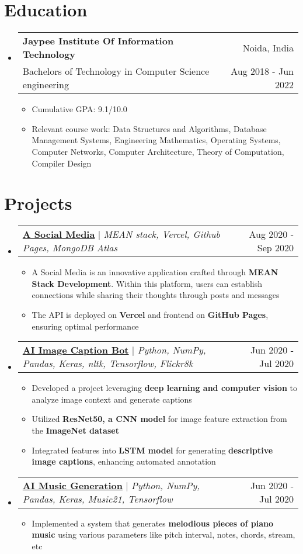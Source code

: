 \documentclass[letterpaper,13pt]{article}
\makeatletter
\newcommand{\resumeItem}[1]{
  \item\small{
    {#1 \vspace{-2pt}}
  }
}
\newcommand{\resumeSubheading}[4]{
  \vspace{-2pt}\item
    \begin{tabular*}{0.97\textwidth}[t]{l@{\extracolsep{\fill}}r}
      \textbf{#1} & #2 \\
      #3 & \small{#4} \\
    \end{tabular*}\vspace{-7pt}
}
\newcommand{\resumeProjectHeading}[2]{
    \item
    \begin{tabular*}{0.97\textwidth}{l@{\extracolsep{\fill}}r}
      \small#1 & #2 \\
    \end{tabular*}\vspace{-7pt}
}
\newcommand{\resumeItemListStart}{\begin{itemize}}
\newcommand{\resumeItemListEnd}{\end{itemize}\vspace{-5pt}}
\makeatother
\begin{document}
\section{Education}
  \begin{itemize}[leftmargin=*, label={}]
    \resumeSubheading
      {Jaypee Institute Of Information Technology}{Noida, India}
      {Bachelors of Technology in Computer Science engineering}{Aug 2018 - Jun 2022}
      \resumeItemListStart
      \resumeItem{Cumulative GPA: 9.1/10.0}
      \resumeItem{Relevant course work: Data Structures and Algorithms, Database Management Systems, Engineering Mathematics, Operating Systems, Computer Networks, Computer Architecture, Theory of Computation, Compiler Design}
      \resumeItemListEnd
  \end{itemize}

\section{Projects}
    \begin{itemize}[leftmargin=*, label={}]
      \resumeProjectHeading
          {\href{https://github.com/JayantGoel001/A-Social-Media}{\textbf{A Social Media}} $|$ \emph{MEAN stack, Vercel, Github Pages, MongoDB Atlas}}{Aug 2020 - Sep 2020}
          \resumeItemListStart
            \resumeItem{A Social Media is an innovative application crafted through \textbf{MEAN Stack Development}. Within this platform, users can establish connections while sharing their thoughts through posts and messages}
            \resumeItem{The API is deployed on \textbf{Vercel} and frontend on \textbf{GitHub Pages}, ensuring optimal performance}
          \resumeItemListEnd
      \resumeProjectHeading
          {\href{https://github.com/JayantGoel001/AI-Image-Caption-Bot}{\textbf{AI Image Caption Bot}} $|$ \emph{Python, NumPy, Pandas, Keras, nltk, Tensorflow, Flickr8k}}{Jun 2020 - Jul 2020}
          \resumeItemListStart
            \resumeItem{Developed a project leveraging \textbf{deep learning and computer vision} to analyze image context and generate captions}
            \resumeItem{Utilized \textbf{ResNet50, a CNN model} for image feature extraction from the \textbf{ImageNet dataset}}
            \resumeItem{Integrated features into \textbf{LSTM model} for generating \textbf{descriptive image captions}, enhancing automated annotation}
          \resumeItemListEnd
      \resumeProjectHeading
          {\href{https://github.com/JayantGoel001/AI-Music-Generation}{\textbf{AI Music Generation}} $|$ \emph{Python, NumPy, Pandas, Keras, Music21, Tensorflow}}{Jun 2020 - Jul 2020}
          \resumeItemListStart
            \resumeItem{Implemented a system that generates \textbf{melodious pieces of piano music} using various parameters like pitch interval, notes, chords, stream, etc}
          \resumeItemListEnd
    \end{itemize}
\end{document}
